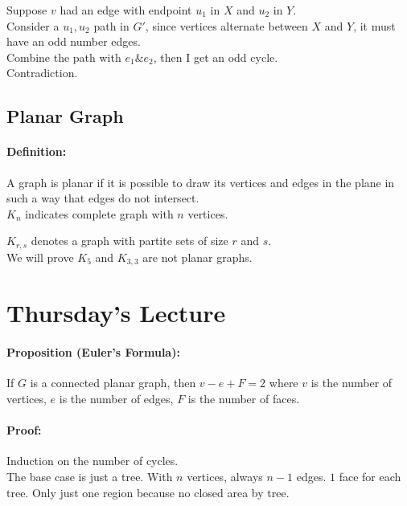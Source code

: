 \documentclass[a4paper, 11pt, twoside]{article}
\begin{document}
Suppose $v$ had an edge with endpoint $u_1$ in $X$ and $u_2$ in $Y$.\\

Consider a $u_1, u_2$ path in $G'$, since vertices alternate between $X$ and $Y$, it must have an odd number edges.\\

Combine the path with $e_1 \& e_2$, then I get an odd cycle.\\

Contradiction.

\subsection{Planar Graph}

\paragraph{Definition:} A graph is planar if it is possible to draw its vertices and edges in the plane in such a way that edges do not intersect.\\

$K_n$ indicates complete graph with $n$ vertices.

$K_{r, s}$ denotes a graph with partite sets of size $r$ and $s$.\\

We will prove $K_5$ and $K_{3,3}$ are not planar graphs.

\section{Thursday's Lecture}

\paragraph{Proposition (Euler's Formula):} If $G$ is a connected planar graph, then $v-e+F=2$ where $v$ is the number of vertices, $e$ is the number of edges, $F$ is the number of faces.

\paragraph{Proof:} Induction on the number of cycles.\\

The base case is just a tree. With $n$ vertices, always $n-1$ edges. $1$ face for each tree. Only just one region because no closed area by tree.\\
\end{document}
